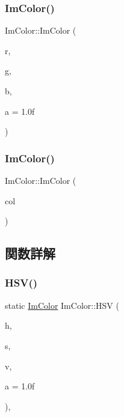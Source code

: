 \mbox{\label{struct_im_color_a92b53917ca9d90a7207b18270ff5453d}} 
\subsubsection{\texorpdfstring{Im\+Color()}{ImColor()}\hspace{0.1cm}{\footnotesize\ttfamily [4/5]}}
{\footnotesize\ttfamily Im\+Color\+::\+Im\+Color (\begin{DoxyParamCaption}\item[{float}]{r,  }\item[{float}]{g,  }\item[{float}]{b,  }\item[{float}]{a = {\ttfamily 1.0f} }\end{DoxyParamCaption})\hspace{0.3cm}{\ttfamily [inline]}}

\mbox{\label{struct_im_color_aa5306926b3ef766a8647b26bdfd9f8d2}} 
\subsubsection{\texorpdfstring{Im\+Color()}{ImColor()}\hspace{0.1cm}{\footnotesize\ttfamily [5/5]}}
{\footnotesize\ttfamily Im\+Color\+::\+Im\+Color (\begin{DoxyParamCaption}\item[{const \mbox{\hyperlink{struct_im_vec4}{Im\+Vec4}} \&}]{col }\end{DoxyParamCaption})\hspace{0.3cm}{\ttfamily [inline]}}



\subsection{関数詳解}
\mbox{\label{struct_im_color_ac8cb52119648523038818a613becf010}} 
\subsubsection{\texorpdfstring{H\+S\+V()}{HSV()}}
{\footnotesize\ttfamily static \mbox{\hyperlink{struct_im_color}{Im\+Color}} Im\+Color\+::\+H\+SV (\begin{DoxyParamCaption}\item[{float}]{h,  }\item[{float}]{s,  }\item[{float}]{v,  }\item[{float}]{a = {\ttfamily 1.0f} }\end{DoxyParamCaption})\hspace{0.3cm}{\ttfamily [inline]}, {\ttfamily [static]}}

